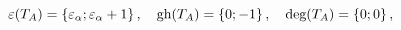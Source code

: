 \begin{equation}\label{3.31}
\varepsilon(T_{A})=\left\{\varepsilon_{\alpha};
\varepsilon_{\alpha }+1\right\},\quad
\hbox{gh}(T_{A})=\left\{0;-1\right\},\quad
\hbox{deg}(T_{A})=\left\{0;0\right\},
\end{equation}

